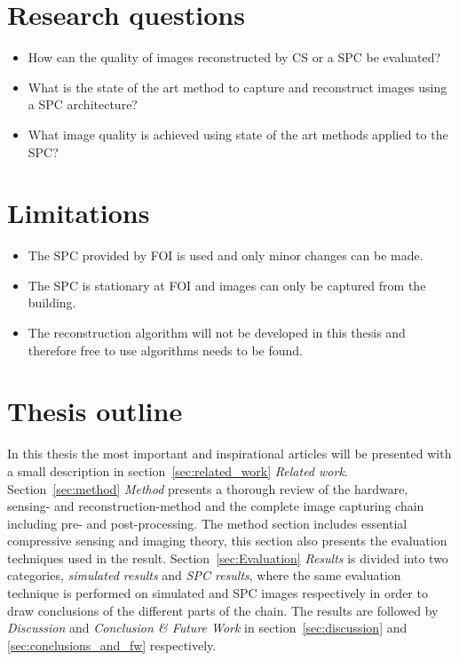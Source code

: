 
\section{Research questions} 
\label{sec:RQ}
\begin{itemize}
    \item How can the quality of images reconstructed by CS or a SPC be evaluated?
    \item What is the state of the art method to capture and reconstruct images using a SPC architecture?
    \item What image quality is achieved using state of the art methods applied to the SPC?
\end{itemize}

\section{Limitations}
\begin{itemize}
    \item The SPC provided by FOI is used and only minor changes can be made.
    \item The SPC is stationary at FOI and images can only be captured from the building.
    \item The reconstruction algorithm will not be developed in this thesis and therefore free to use algorithms needs to be found.
\end{itemize}



\section{Thesis outline}
In this thesis the most important and inspirational articles will be presented with a small description in section~\ref{sec:related_work} \textit{Related work}. Section~\ref{sec:method} \textit{Method} presents a thorough review of the hardware, sensing- and reconstruction-method and the complete image capturing chain including pre- and post-processing. The method section includes essential compressive sensing and imaging theory, this section also presents the evaluation techniques used in the result. Section~\ref{sec:Evaluation} \textit{Results} is divided into two categories, \textit{simulated results} and \textit{SPC results}, where the same evaluation technique is performed on simulated and SPC images respectively in order to draw conclusions of the different parts of the chain. The results are followed by \textit{Discussion} and \textit{Conclusion \& Future Work} in section~\ref{sec:discussion} and \ref{sec:conclusions_and_fw} respectively. 

